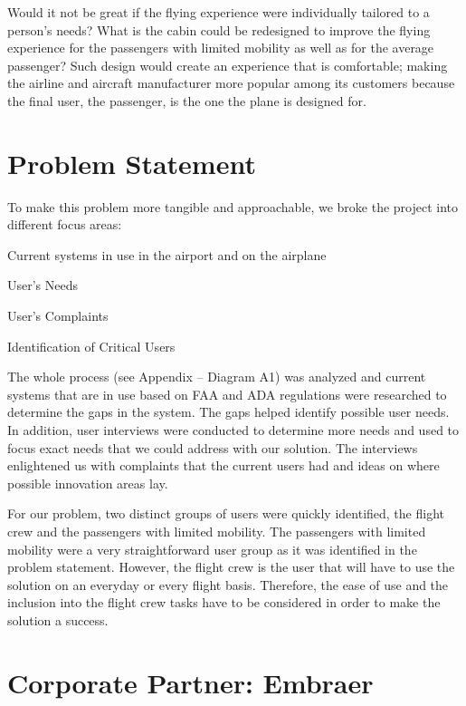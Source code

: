 Would it not be great if the flying experience were individually tailored to a person’s needs? What is the cabin could be redesigned to improve the flying experience for the passengers with limited mobility as well as for the average passenger? Such design would create an experience that is comfortable; making the airline and aircraft manufacturer more popular among its customers because the final user, the passenger, is the one the plane is designed for.

\section{Problem Statement}
To make this problem more tangible and approachable, we broke the project into different focus areas:

\begin{list}{-}{}
  \item Current systems in use in the airport and on the airplane
  \item User’s Needs
  \item User’s Complaints
  \item Identification of Critical Users
\end{list}

The whole process (see Appendix – Diagram A1) was analyzed and current systems that are in use based on FAA and ADA regulations were researched to determine the gaps in the system.  The gaps helped identify possible user needs.  In addition, user interviews were conducted to determine more needs and used to focus exact needs that we could address with our solution.  The interviews enlightened us with complaints that the current users had and ideas on where possible innovation areas lay.

For our problem, two distinct groups of users were quickly identified, the flight crew and the passengers with limited mobility.   The passengers with limited mobility were a very straightforward user group as it was identified in the problem statement.  However, the flight crew is the user that will have to use the solution on an everyday or every flight basis.  Therefore, the ease of use and the inclusion into the flight crew tasks have to be considered in order to make the solution a success.

\section{Corporate Partner: Embraer}

